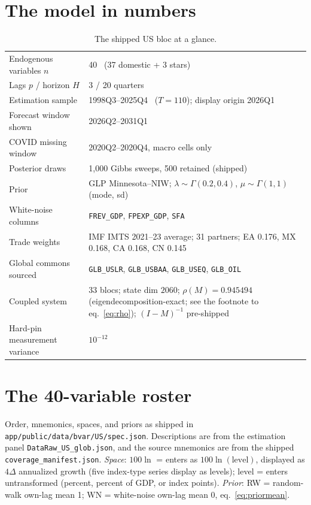 \documentclass[11pt]{article}
\newcommand{\code}[1]{\texttt{\small #1}}
\begin{document}
\section{The model in numbers}

\begin{table}[h]
\centering
\caption{The shipped US bloc at a glance.}
\label{tab:numbers}
\small
\begin{tabular}{l p{9.6cm}}
\toprule
Endogenous variables $n$ & 40 \ (37 domestic + 3 stars) \\
Lags $p$ / horizon $H$ & 3 / 20 quarters \\
Estimation sample & 1998Q3--2025Q4 \ ($T = 110$); display origin 2026Q1 \\
Forecast window shown & 2026Q2--2031Q1 \\
COVID missing window & 2020Q2--2020Q4, macro cells only \\
Posterior draws & 1{,}000 Gibbs sweeps, 500 retained (shipped) \\
Prior & GLP Minnesota--NIW; $\lambda \sim \Gamma(0.2, 0.4)$, $\mu \sim \Gamma(1,1)$ (mode, sd) \\
White-noise columns & \code{FREV\_GDP}, \code{FPEXP\_GDP}, \code{SFA} \\
Trade weights & IMF IMTS 2021--23 average; 31 partners; EA 0.176, MX 0.168, CA 0.168, CN 0.145 \\
Global commons sourced & \code{GLB\_USLR}, \code{GLB\_USBAA}, \code{GLB\_USEQ}, \code{GLB\_OIL} \\
Coupled system & 33 blocs; state dim $2060$; $\rho(M) = 0.945494$ (eigendecomposition-exact;
see the footnote to eq.~\eqref{eq:rho}); $(I-M)^{-1}$ pre-shipped \\
Hard-pin measurement variance & $10^{-12}$ \\
\bottomrule
\end{tabular}
\end{table}

\clearpage
\appendix

\section{The 40-variable roster}\label{app:roster}

Order, mnemonics, spaces, and priors as shipped in \code{app/public/data/bvar/US/spec.json}.
Descriptions are from the estimation panel \code{DataRaw\_US\_glob.json}, and the source
mnemonics are from the shipped \code{coverage\_manifest.json}. \emph{Space}:
$100\ln$ = enters as $100\ln(\text{level})$, displayed as $4\Delta$ annualized growth (five index-type
series display as levels); level = enters untransformed (percent, percent of GDP, or index points).
\emph{Prior}: RW = random-walk own-lag mean 1; WN = white-noise own-lag mean 0, eq.~\eqref{eq:priormean}.
\end{document}
